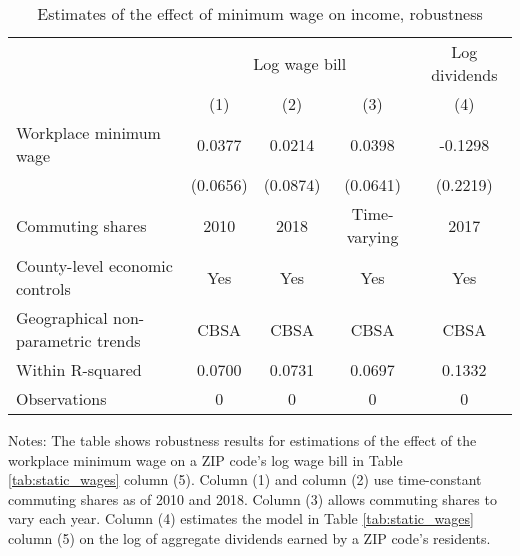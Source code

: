 \begin{table}[]
    \caption{Estimates of the effect of minimum wage on income, robustness}
    \label{tab:static_wages_robustness}

    \begin{tabular}{@{}lcccc@{}}
        \toprule
                                        & \multicolumn{3}{c}{Log wage bill} & Log dividends      \\ \cmidrule(l){2-5} 
                                        & (1)       & (2)      & (3)          & (4)              \\ \midrule
        Workplace minimum wage             & 0.0377   & 0.0214    & 0.0398       & -0.1298            \\
                                        & (0.0656) & (0.0874)  & (0.0641)     & (0.2219)          \\ \midrule
        Commuting shares                   & 2010     & 2018      & Time-varying & 2017              \\
        County-level economic controls     & Yes      & Yes       & Yes          & Yes               \\
        Geographical non-parametric trends & CBSA     & CBSA      & CBSA         & CBSA              \\
        Within R-squared                   & 0.0700   & 0.0731    & 0.0697        & 0.1332              \\
        Observations                       & 0  & 0   & 0       & 0              \\ \bottomrule
    \end{tabular}
    
    \begin{minipage}{.95\textwidth} \footnotesize
        \vspace{2mm}
        Notes: The table shows robustness results for estimations of the effect of the workplace
        minimum wage on a ZIP code's log wage bill in Table \ref{tab:static_wages} column (5).
        Column (1) and column (2) use time-constant commuting shares as of 2010 and 2018.
        Column (3) allows commuting shares to vary each year.
        Column (4) estimates the model in Table \ref{tab:static_wages} column (5) on the log
        of aggregate dividends earned by a ZIP code's residents.
    \end{minipage}
\end{table}
